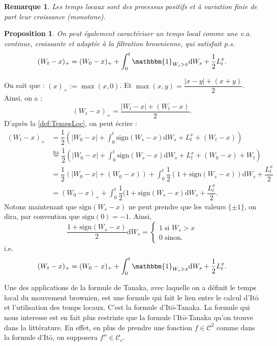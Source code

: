 \documentclass[openany]{book}
\makeatletter
\newcommand{\1}{\mathbbm{1}}
\newcommand{\sign}{\text{sign}}
\renewcommand{\d}{\mathrm{d}}
\renewenvironment{proof}[1][\textbf{\textit{Démonstration}}]{%
  \par\pushQED{\qed}%
  \normalfont\topsep6\p@\@plus6\p@\relax
  \trivlist\item[\hskip\labelsep
    #1\@addpunct{.}]\ignorespaces
}{%
  \popQED\endtrivlist\@endpefalse
}
\theoremstyle{thmfont}
\theoremstyle{deffont}
\theoremstyle{thmfont}
\newtheorem{prop}[prop]{Proposition}
\theoremstyle{deffont}
\newtheorem{remark}[remark]{Remarque}
\makeatother
\begin{document}
\begin{remark}
Les temps locaux sont des processus \textit{positifs} et à \textit{variation finie} de part leur croissance (monotone).
\end{remark}

\begin{prop}
  \label{prop:Tanaka2}
  On peut également caractériser un \textit{temps local} comme une v.a. continue, croissante et adaptée à la filtration brownienne, qui satisfait p.s.
  \begin{equation}
    (W_t - x)_+ = (W_0 - x)_+ + \int_0^t \1_{W_s > x}\d W_s + \dfrac{1}{2}L_t^x.
  \end{equation}
\end{prop}

\begin{proof}
  On sait que : $(x)_+ := \max(x, 0)$. Et $\max(x,y) = \dfrac{|x-y| + (x+y)}{2}$.
  Ainsi, on a : $$(W_t - x)_+ = \dfrac{|W_t - x| + (W_t - x)}{2}.$$
  D'après la \autoref{def:TempsLoc}, on peut écrire :
  \begin{align*}
    (W_t - x)_+ &= \dfrac{1}{2}\left(|W_0 - x| + \int_0^t\sign(W_s - x)\d W_s + L_t^x + (W_t - x)\right)\\
    &\overset{\text{Itō}}{=} \dfrac{1}{2} \left(|W_0 - x| + \int_0^t\sign(W_s - x)\d W_s + L_t^x + (W_0 - x) + W_t \right)\\
    &= \dfrac{1}{2} \left(|W_0 - x| + (W_0 - x) \right) + \int_0^t\dfrac{1}{2}(1 + \sign(W_s - x))\d W_s + \dfrac{L_t^x}{2}\\
    &= (W_0 - x)_+ + \int_0^t\dfrac{1}{2}(1 + \sign(W_s - x) \d W_s + \dfrac{L_t^x}{2}.
  \end{align*}
  Notons maintenant que $\sign(W_s - x)$ ne peut prendre que les valeurs $\{\pm 1\}$, on dira, par convention que $\sign(0) = -1$. Ainsi,
  $$ \dfrac{1 + \sign(W_s - x)}{2}\d W_s =
  \begin{cases} 1\; \text{si } W_s > x\\
                0 \; \text{sinon.}
  \end{cases}
  $$
 i.e.
 $$(W_t - x)_+ = (W_0 - x)_+ + \int_0^t\1_{W_s > x} \d W_s + \frac{1}{2}L_t^x.$$
  
\end{proof}

Une des applications de la formule de Tanaka, avec laquelle on a définit le temps local du mouvement brownien, est une formule qui fait le lien entre le calcul d'Itō et l'utilisation des temps locaux. C'est la formule d'Itō-Tanaka. La formule qui nous interesse est en fait plus restrinte que la formule l'Itō-Tanaka qu'on trouve dans la littérature. En effet, en plus de prendre une fonction $f \in \mathcal C^2$ comme dans la formule d'Itō, on supposera $f'' \in \mathcal C_c$.
\end{document}
